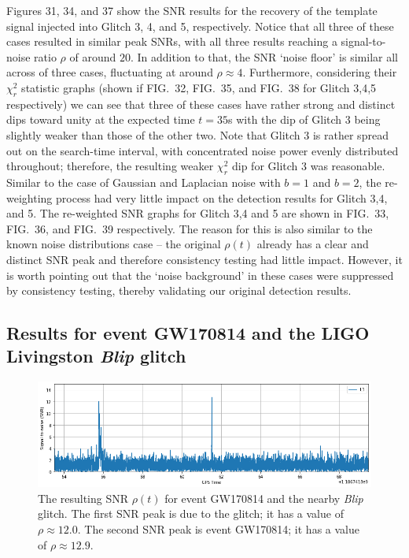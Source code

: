 \documentclass[preprint,
letterpaper,
 amsmath,amssymb,
 aps,
]{revtex4-2}
\begin{document}
Figures 31, 34, and 37 show the SNR results for the recovery of the template signal injected into Glitch 3, 4, and 5, respectively. Notice that all three of these cases resulted in similar peak SNRs, with all three results reaching a signal-to-noise ratio $\rho$ of around $20$. In addition to that, the SNR `noise floor' is similar all across of three cases, fluctuating at around $\rho\approx 4$. Furthermore, considering their $\chi_r^2$ statistic graphs (shown if FIG.\ 32, FIG.\ 35, and FIG.\ 38 for Glitch 3,4,5 respectively) we can see that three of these cases have rather strong and distinct dips toward unity at the expected time $t=35$s with the dip of Glitch 3 being slightly weaker than those of the other two. Note that Glitch 3 is rather spread out on the search-time interval, with concentrated noise power evenly distributed throughout; therefore, the resulting weaker $\chi_r^2$ dip for Glitch 3 was reasonable. Similar to the case of Gaussian and Laplacian noise with $b=1$ and $b=2$, the re-weighting process had very little impact on the detection results for Glitch 3,4, and 5. The re-weighted SNR graphs for Glitch 3,4 and 5 are shown in FIG.\ 33, FIG.\ 36, and FIG.\ 39 respectively. The reason for this is also similar to the known noise distributions case – the original $\rho(t)$ already has a clear and distinct SNR peak and therefore consistency testing had little impact. However, it is worth pointing out that the `noise background' in these cases were suppressed by consistency testing, thereby validating our original detection results.  

\subsection{Results for event GW170814 and the LIGO Livingston \textit{Blip} glitch}

\begin{figure}
\includegraphics[width = .9\textwidth]{blip orig snr.png}
\caption{The resulting SNR $\rho(t)$ for event GW170814 and the nearby \textit{Blip} glitch. The first SNR peak is due to the glitch; it has a value of $\rho\approx12.0$. The second SNR peak is event GW170814; it has a value of $\rho\approx12.9$.}
\centering
\end{figure} 
\end{document}
